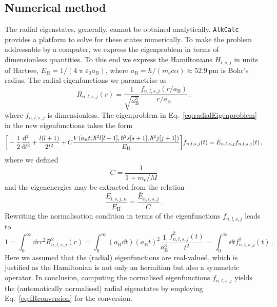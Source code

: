 \documentclass[fontsize=12pt,
               twoside=false,
               BCOR=0mm,
               DIV=14,
               overfullrule=true, %
               toc=bibliography,
               headinclude=true,
               footinclude=false]{scrartcl}
\numberwithin{equation}{section}
\newcommand{\pii}{\uppi}
\newcommand{\aB}{a_\mathrm{B}}
\newcommand{\me}{m_\mathrm{e}}
\newcommand{\EH}{E_\mathrm{H}}
\newcommand{\alkcalc}{\texttt{AlkCalc} }
\begin{document}
    \subsection{Numerical method}
    \label{subsec:NumericalMathod}

    The radial eigenstates, generally, cannot be obtained analytically.
    \alkcalc provides a platform to solve for these states numerically. To make
    the problem addressable by a computer, we express the eigenproblem in terms
    of dimensionless quantities. To this end we express the Hamiltonians
    $H_{l,s,j}$ in units of Hartree,
    $E_\mathrm{H}=1\slash{(4\pii\varepsilon_0a_\mathrm{B})}$, where
    $a_\mathrm{B}=\hbar\slash{(m_\mathrm{e}c\alpha)}\approx52.9\,\mathrm{pm}$ is
    Bohr's radius. The radial eigenfunctions we parametrise as
    \begin{equation}\label{eq:fRconversion}
        R_{n,l,s,j}(r)
        =
        \frac{1}{\sqrt{\aB^3}}\frac{f_{n,l,s,j}(r\slash\aB)}{r\slash\aB}
        \,.
    \end{equation}
    where $f_{n,l,s,j}$ is dimensionless. The eigenproblem in
    Eq.~\eqref{eq:radialEigenproblem} in the new eigenfunctions takes the form
    \begin{equation}\label{eq:eigenproblem}
        \bigg[
        -
        \frac{1}{2}
        \dv[2]{t}
        +\frac{l(l+1)}{2t^2}
        +C\frac{V(\aB{t};\hbar^2l[l+1],\hbar^2s[s+1],\hbar^2j[j+1])}{\EH}
        \bigg]
        f_{n,l,s,j}(t)
        =
        \bar{E}_{n,l,s,j}
        f_{n,l,s,j}(t)
    \,,
    \end{equation}
    where we defined
    \begin{equation}
        C = \frac{1}{1+\me\slash{M}}
    \end{equation}
    and the eigenenergies may be extracted from the relation
    \begin{equation}
        \frac{E_{l,s,j,n}}{E_\mathrm{H}}
        =
        \frac{\bar{E}_{n,l,s,j}}{C}
    \,.
    \end{equation}
    Rewriting the normalisation condition in terms of the eigenfunctions
    $f_{n,l,s,j}$ leads to
    \begin{equation}\label{eq:normalisation}
        1
        =
        \int^\infty_0\dd{r}r^2R^2_{n,l,s,j}(r)
        =
        \int^\infty_0 (\aB\dd{t})(\aB t)^2 \frac{1}{\aB^3}
        \frac{f^2_{n,l,s,j}(t)}{t^2}
        =
        \int^\infty_0\dd{t}f^2_{n,l,s,j}(t)
    \,.
    \end{equation}
    Here we assumed that the (radial) eigenfunctions are real-valued, which is
    justified as the Hamiltonian is not only an hermitian but also a symmetric
    operator. In conclusion, computing the normalised eigenfunctions
    $f_{n,l,s,j}$ yields the (automatically normalised) radial eigenstates by
    employing Eq.~\eqref{eq:fRconversion} for the conversion.
\end{document}
